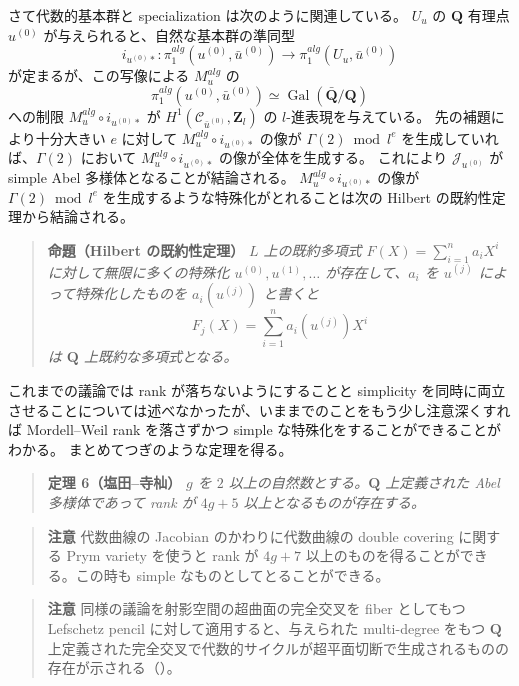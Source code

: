 \documentclass[uplatex,dvipdfmx]{jlreq}
\def\Gal{\operatorname{Gal}}
\begin{document}
さて代数的基本群と specialization は次のように関連している。
$U_u$ の $\mathbf{Q}$ 有理点 $u^{(0)}$ が与えられると、自然な基本群の準同型
\[
  i_{u^{(0)}*} : \pi_1^{alg}(u^{(0)}, \bar{u}^{(0)}) \to \pi_1^{alg}(U_u, \bar{u}^{(0)})
\]
が定まるが、この写像による $M_u^{alg}$ の
\[
  \pi_1^{alg}(u^{(0)}, \bar{u}^{(0)}) \simeq \Gal(\bar{\mathbf{Q}} / \mathbf{Q})
\]
への制限 $M_u^{alg} \circ i_{u^{(0)}*}$ が $H^1(\mathcal{C}_{\bar{u}^{(0)}}, \mathbf{Z}_l)$ の $l$-進表現を与えている。
先の補題により十分大きい $e$ に対して $M_u^{alg} \circ i_{u^{(0)}*}$ の像が $\Gamma(2) \bmod l^e$ を生成していれば、$\Gamma(2)$ において $M_u^{alg} \circ i_{u^{(0)}*}$ の像が全体を生成する。
これにより $\mathcal{J}_{u^{(0)}}$ が simple Abel 多様体となることが結論される。
$M_u^{alg} \circ i_{u^{(0)}*}$ の像が $\Gamma(2) \bmod l^e$ を生成するような特殊化がとれることは次の Hilbert の既約性定理から結論される。

\begin{quote}
\textbf{命題（Hilbert の既約性定理）}\quad
\textit{$L$ 上の既約多項式 $F(X) = \sum_{i=1}^n a_i X^i$ に対して無限に多くの特殊化 $u^{(0)}, u^{(1)}, \dots$ が存在して、$a_i$ を $u^{(j)}$ によって特殊化したものを $a_i(u^{(j)})$ と書くと
\[
  F_j(X) = \sum_{i=1}^n a_i(u^{(j)}) X^i
\]
は $\mathbf{Q}$ 上既約な多項式となる。}
\end{quote}

これまでの議論では rank が落ちないようにすることと simplicity を同時に両立させることについては述べなかったが、いままでのことをもう少し注意深くすれば Mordell--Weil rank を落さずかつ simple な特殊化をすることができることがわかる。
まとめてつぎのような定理を得る。

\begin{quote}
\textbf{定理 6（塩田--寺杣）}\quad
\textit{$g$ を $2$ 以上の自然数とする。$\mathbf{Q}$ 上定義された Abel 多様体であって rank が $4g + 5$ 以上となるものが存在する。}
\end{quote}

\begin{quote}
\textbf{注意}\quad
代数曲線の Jacobian のかわりに代数曲線の double covering に関する Prym variety を使うと rank が $4g + 7$ 以上のものを得ることができる。この時も simple なものとしてとることができる。
\end{quote}

\begin{quote}
\textbf{注意}\quad
同様の議論を射影空間の超曲面の完全交叉を fiber としてもつ Lefschetz pencil に対して適用すると、与えられた multi-degree をもつ $\mathbf{Q}$ 上定義された完全交叉で代数的サイクルが超平面切断で生成されるものの存在が示される（\cite{T}）。
\end{quote}
\end{document}
